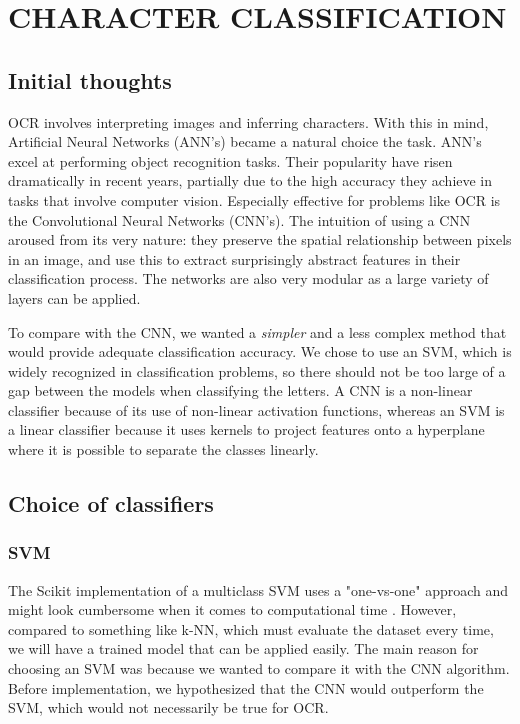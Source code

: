 \section{CHARACTER CLASSIFICATION}
\label{sec:class}

\subsection{Initial thoughts}
OCR involves interpreting images and inferring characters. With this in mind, Artificial Neural Networks (ANN's) became a natural choice the task. ANN's excel at performing object recognition tasks. Their popularity have risen dramatically in recent years, partially due to the high accuracy they achieve in tasks that involve computer vision. Especially effective for problems like OCR is the Convolutional Neural Networks (CNN's). The intuition of using a CNN aroused from its very nature: they preserve the spatial relationship between pixels in an image, and use this to extract surprisingly abstract features in their classification process. The networks are also very modular as a large variety of layers can be applied.

To compare with the CNN, we wanted a \textit{simpler} and a less complex method that would provide adequate classification accuracy. We chose to use an SVM, which is widely recognized in classification problems, so there should not be too large of a gap between the models when classifying the letters. A CNN is a non-linear classifier because of its use of non-linear activation functions, whereas an SVM is a linear classifier because it uses kernels to project features onto a hyperplane where it is possible to separate the classes linearly. 

\subsection{Choice of classifiers}
\subsubsection{SVM}
The Scikit implementation of a multiclass SVM uses a "one-vs-one" approach and might look cumbersome when it comes to computational time \cite{sklearn_api}. However, compared to something like k-NN, which must evaluate the dataset every time, we will have a trained model that can be applied easily. The main reason for choosing an SVM was because we wanted to compare it with the CNN algorithm. Before implementation, we hypothesized that the CNN would outperform the SVM, which would not necessarily be true for OCR.

